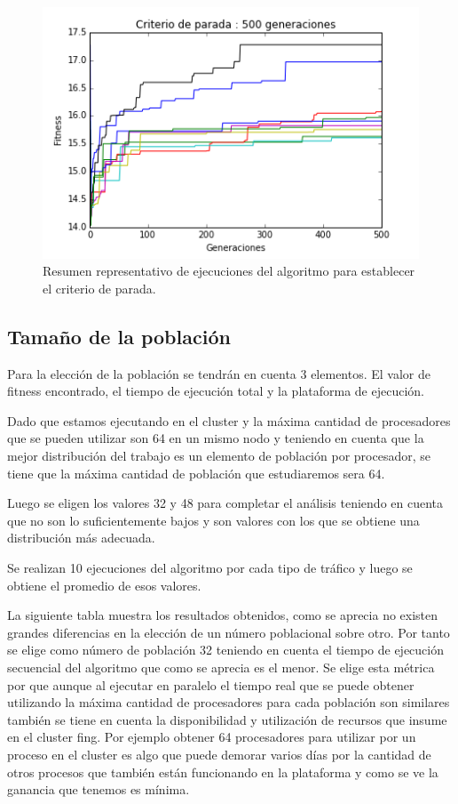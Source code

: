 \begin{figure}[h]
\centering
\includegraphics[width=0.7\linewidth]{Figures/criterio_parada}
\caption{Resumen representativo de ejecuciones del algoritmo para establecer el criterio de parada.}
\label{fig:criterio_parada}
\end{figure}



\subsection{Tamaño de la población}

Para la elección de la población se tendrán en cuenta 3 elementos. El valor de fitness encontrado, el tiempo de ejecución total y la plataforma de ejecución.

Dado que estamos ejecutando en el cluster y la máxima cantidad de procesadores que se pueden utilizar son 64 en un mismo nodo y teniendo en cuenta que la mejor distribución del trabajo es un elemento de población por procesador, se tiene que la máxima cantidad de población que estudiaremos sera 64.

Luego se eligen los valores 32 y 48 para completar el análisis teniendo en cuenta que no son lo suficientemente bajos y son valores con los que se obtiene una distribución más adecuada.

Se realizan 10 ejecuciones del algoritmo por cada tipo de tráfico y luego se obtiene el promedio de esos valores.

La siguiente tabla muestra los resultados obtenidos, como se aprecia no existen grandes diferencias en la elección de un número poblacional sobre otro. Por tanto se elige como número de población 32 teniendo en cuenta el tiempo de ejecución secuencial del algoritmo que como se aprecia es el menor. Se elige esta métrica por que aunque al ejecutar en paralelo el tiempo real que se puede obtener utilizando la máxima cantidad de procesadores para cada población son similares también se tiene en cuenta la disponibilidad y utilización de recursos que insume en el cluster fing. Por ejemplo obtener 64 procesadores para utilizar por un proceso en el cluster es algo que puede demorar varios días por la cantidad de otros procesos que también están funcionando en la plataforma y como se ve la ganancia que tenemos es mínima.

